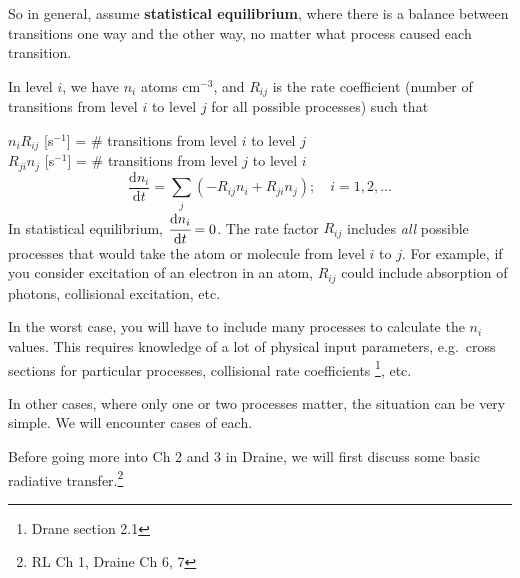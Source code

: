 \documentclass[11pt]{article}
\newcommand{\mar}[1]{\hspace{0pt}\marginpar{-\textcolor{black}{#1}-}}
\begin{document}
So in general, assume \textbf{statistical equilibrium}, where there is
a balance between transitions one way and the other way, no matter
what process caused each transition.

In level $i$, we have $n_{i}$ atoms cm$^{-3}$, and
$R_{ij}$ is the rate coefficient (number of transitions from level $i$
to level $j$ for all possible processes) such that

$n_{i}R_{ij}$ [s$^{-1}$] = \# transitions from level $i$ to level $j$\\
$R_{ji}n_{j}$ [s$^{-1}$] = \# transitions from level $j$ to level $i$\\

\[
    \frac{\mathrm{d}n_{i}}{\mathrm{d}t} =
    \sum_{j}\left(-R_{ij}n_{i} + R_{ji}n_{j}\right);\quad i=1,2,\ldots
    \]
\mar{23}In statistical equilibrium,
$\cfrac{\mathrm{d}n_{i}}{\mathrm{d}t} = 0$. The rate factor $R_{ij}$
includes \emph{all} possible processes that would take the atom or
molecule from level $i$ to $j$.
For example, if you consider excitation of an electron in an atom,
$R_{ij}$ could include absorption of photons, collisional excitation, etc.

In the worst case, you will have to include many processes to calculate the
$n_{i}$ values. This requires knowledge of a lot of physical input
parameters, e.g.\ cross sections for particular processes, collisional rate
coefficients \footnote{Drane section 2.1}, etc.

In other cases, where only one or two processes matter, the situation
can be very simple. We will encounter cases of each.

Before going more into Ch 2 and 3 in Draine, we will first discuss
some basic radiative transfer.\footnote{RL Ch 1, Draine Ch 6, 7}

\newpage
\end{document}
